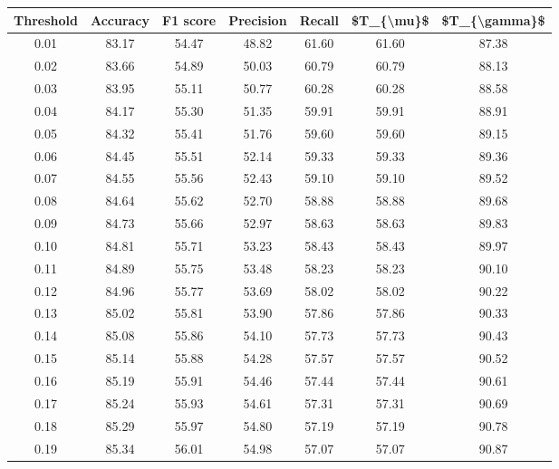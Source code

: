 \begin{tabular}{|c|c|c|c|c|c|c|}
\hline
 Threshold &  Accuracy &  F1 score &  Precision &  Recall &  \$T\_\{\textbackslash mu\}\$ &  \$T\_\{\textbackslash gamma\}\$ \\
\hline
      0.01 &     83.17 &     54.47 &      48.82 &   61.60 &      61.60 &         87.38 \\
      0.02 &     83.66 &     54.89 &      50.03 &   60.79 &      60.79 &         88.13 \\
      0.03 &     83.95 &     55.11 &      50.77 &   60.28 &      60.28 &         88.58 \\
      0.04 &     84.17 &     55.30 &      51.35 &   59.91 &      59.91 &         88.91 \\
      0.05 &     84.32 &     55.41 &      51.76 &   59.60 &      59.60 &         89.15 \\
      0.06 &     84.45 &     55.51 &      52.14 &   59.33 &      59.33 &         89.36 \\
      0.07 &     84.55 &     55.56 &      52.43 &   59.10 &      59.10 &         89.52 \\
      0.08 &     84.64 &     55.62 &      52.70 &   58.88 &      58.88 &         89.68 \\
      0.09 &     84.73 &     55.66 &      52.97 &   58.63 &      58.63 &         89.83 \\
      0.10 &     84.81 &     55.71 &      53.23 &   58.43 &      58.43 &         89.97 \\
      0.11 &     84.89 &     55.75 &      53.48 &   58.23 &      58.23 &         90.10 \\
      0.12 &     84.96 &     55.77 &      53.69 &   58.02 &      58.02 &         90.22 \\
      0.13 &     85.02 &     55.81 &      53.90 &   57.86 &      57.86 &         90.33 \\
      0.14 &     85.08 &     55.86 &      54.10 &   57.73 &      57.73 &         90.43 \\
      0.15 &     85.14 &     55.88 &      54.28 &   57.57 &      57.57 &         90.52 \\
      0.16 &     85.19 &     55.91 &      54.46 &   57.44 &      57.44 &         90.61 \\
      0.17 &     85.24 &     55.93 &      54.61 &   57.31 &      57.31 &         90.69 \\
      0.18 &     85.29 &     55.97 &      54.80 &   57.19 &      57.19 &         90.78 \\
      0.19 &     85.34 &     56.01 &      54.98 &   57.07 &      57.07 &         90.87 \\

\end{tabular}
